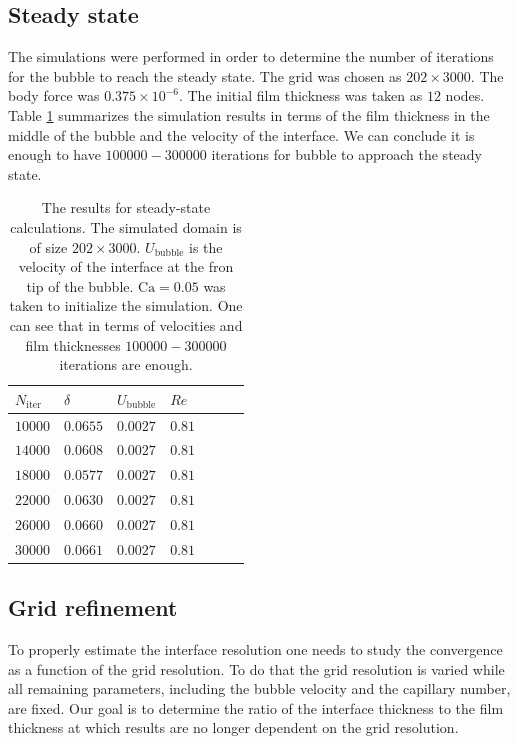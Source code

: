 \documentclass[preprint,12pt]{elsarticle}
\newcommand{\Ca}{\mathrm{Ca}}
\begin{document}
{\color{red}
\subsection{Steady state}
\label{sec:steady:state}
The simulations were performed in order to determine the number of iterations for the bubble to
reach the steady state. The grid was chosen as $202 \times 3000$. The body force was $0.375\times
10^{-6}$. The initial film thickness was taken as $12$ nodes. Table \ref{table:steady:state}
summarizes the simulation results in terms of the film thickness in the middle of the bubble and the
velocity of the interface. We can conclude it is enough to have $100000-300000$ iterations for
bubble to approach the steady state.
\begin{table}
\begin{tabularx}{\textwidth}{|X|X|X|X|X|X|X|}
\hline
$N_\mathrm{iter}$&$\delta$&$U_{\mathrm{bubble}}$&{\color{red} $Re$}\\
\hline
$10000$&$ 0.0655$&$0.0027$&$0.81$\\
\hline
$14000$&$0.0608$&$0.0027$&$0.81$\\
\hline
$18000$&$0.0577$&$0.0027$&$0.81$\\
\hline
$22000$&$0.0630$&$0.0027$&$0.81$\\
\hline
$26000$&$0.0660$&$0.0027$&$0.81$\\
\hline
$30000$&$0.0661$&$0.0027$&$0.81$\\
\hline
\end{tabularx}
\caption{The results for steady-state calculations. The simulated domain is
of size $202 \times 3000$. $U_{\mathrm{bubble}}$ is the velocity of the interface at the fron tip of
the bubble. $\Ca=0.05$ was taken to initialize the simulation. One can see that in terms of
velocities and film thicknesses $100000-300000$ iterations are enough.
\label{table:steady:state}}
\end{table}
}

\subsection{Grid refinement}
\label{section:grid:refinement}
To properly estimate the interface resolution one needs to study the convergence as a function of
the grid resolution. To do that the grid resolution is varied while all remaining parameters,
including the bubble velocity and the capillary number, are fixed.  Our goal is to determine the 
ratio of the interface thickness to the 
film thickness at which results are no longer dependent on the grid resolution.
\end{document}
